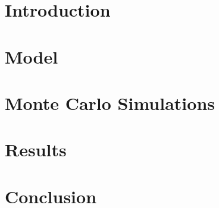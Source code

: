 \documentclass[a4paper,headsepline,bibtotocnumbered,12pt,titlepage,twoside]{scrartcl} %
\begin{document}
    
    \thispagestyle{empty}
    \cleardoublepage
    \setcounter{page}{1}
    \tableofcontents
    \newpage
    \listoffigures
    \listoftables
    \newpage
    \setcounter{page}{1}

    \newpage
    \section{Introduction}
        

    \section{Model}
        

    \section{Monte Carlo Simulations}
        

    \section{Results}
        

    \section{Conclusion}
        

    \clearpage
    
    

    \clearpage
    \begin{appendix}
        
    \end{appendix}

    \cleardoublepage
    
\end{document}

